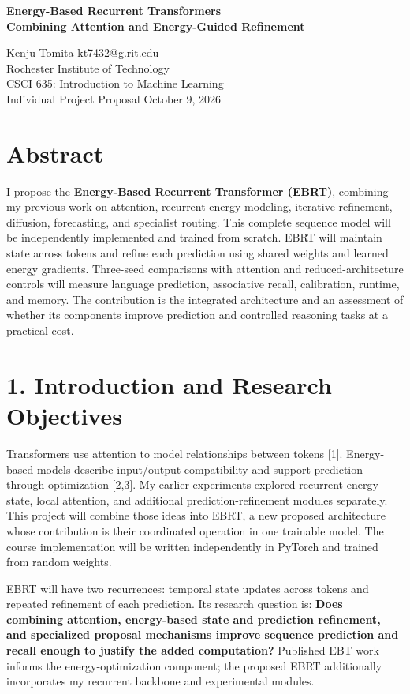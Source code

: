 \documentclass[11pt,letterpaper]{article}
\begin{document}
\begin{center}
{\Large\bfseries Energy-Based Recurrent Transformers\\Combining Attention and Energy-Guided Refinement}\par
\vspace{3pt}
Kenju Tomita \quad \href{mailto:kt7432@g.rit.edu}{kt7432@g.rit.edu}\\
Rochester Institute of Technology\\
CSCI 635: Introduction to Machine Learning\\
Individual Project Proposal \quad October 9, 2026
\end{center}

\section*{Abstract}

I propose the \textbf{Energy-Based Recurrent Transformer (EBRT)}, combining my previous work on attention, recurrent energy modeling, iterative refinement, diffusion, forecasting, and specialist routing. This complete sequence model will be independently implemented and trained from scratch. EBRT will maintain state across tokens and refine each prediction using shared weights and learned energy gradients. Three-seed comparisons with attention and reduced-architecture controls will measure language prediction, associative recall, calibration, runtime, and memory. The contribution is the integrated architecture and an assessment of whether its components improve prediction and controlled reasoning tasks at a practical cost.

\section*{1. Introduction and Research Objectives}

Transformers use attention to model relationships between tokens [1]. Energy-based models describe input/output compatibility and support prediction through optimization [2,3]. My earlier experiments explored recurrent energy state, local attention, and additional prediction-refinement modules separately. This project will combine those ideas into EBRT, a new proposed architecture whose contribution is their coordinated operation in one trainable model. The course implementation will be written independently in PyTorch and trained from random weights.

EBRT will have two recurrences: temporal state updates across tokens and repeated refinement of each prediction. Its research question is: \textbf{Does combining attention, energy-based state and prediction refinement, and specialized proposal mechanisms improve sequence prediction and recall enough to justify the added computation?} Published EBT work informs the energy-optimization component; the proposed EBRT additionally incorporates my recurrent backbone and experimental modules.
\end{document}
